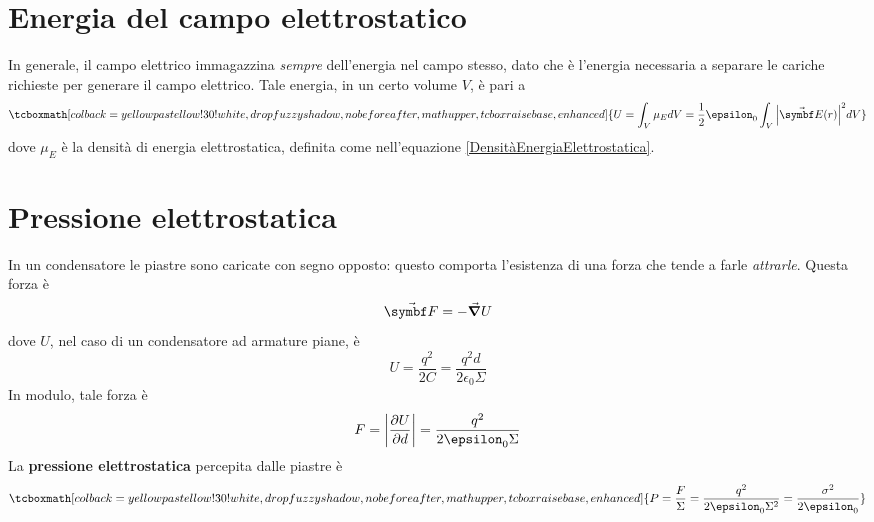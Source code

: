 \section{Energia del campo elettrostatico}
In generale, il campo elettrico immagazzina \textit{sempre} dell'energia nel campo stesso, dato che è l'energia necessaria a separare le cariche richieste per generare il campo elettrico. Tale energia, in un certo volume $V$, è pari a
\begin{equation}
	\tcboxmath[colback=yellowpastellow!30!white,drop fuzzy shadow, nobeforeafter, math upper, tcbox raise base, enhanced]{U=\int_V\mu_EdV=\frac{1}{2}\epsilon_0\int_V\abs{\vba{E}(r)}^2dV}
\end{equation}
dove $\mu_E$ è la densità di energia elettrostatica, definita come nell'equazione \eqref{DensitàEnergiaElettrostatica}.
\section{Pressione elettrostatica}
In un condensatore le piastre sono caricate con segno opposto: questo comporta l'esistenza di una forza che tende a farle \textit{attrarle}. Questa forza è
\begin{equation}
	\vba{F}=-\grad{U}
\end{equation}
dove $U$, nel caso di un condensatore ad armature piane, è
\begin{equation*}
	U=\frac{q^2}{2C}=\frac{q^2d}{2\epsilon_0\Sigma}
\end{equation*}
In modulo, tale forza è
\begin{equation}
	F=\abs{\pdv{U}{d}}=\frac{q^2}{2\epsilon_0\Sigma}
\end{equation}
La \textbf{pressione elettrostatica} percepita dalle piastre è
\begin{equation}
	\tcboxmath[colback=yellowpastellow!30!white,drop fuzzy shadow, nobeforeafter, math upper, tcbox raise base, enhanced]{P=\frac{F}{\Sigma}=\frac{q^2}{2\epsilon_0\Sigma^2}=\frac{\sigma^2}{2\epsilon_0}}
\end{equation}
